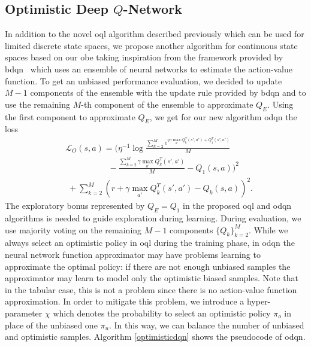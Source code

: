 \subsection{Optimistic Deep $Q$-Network}\label{sec:proposedalg}
In addition to the novel \gls{oql} algorithm described previously which can be used for limited discrete state spaces, we
propose another algorithm for continuous state spaces based on our \gls{obe} taking inspiration from the framework provided by \gls{bdqn}~\cite{osband2017deep}
which uses an ensemble of neural networks to estimate the action-value function.
To get an unbiased performance evaluation, we decided to update $M-1$ components of the ensemble with the update rule provided by \gls{bdqn} and to use the remaining $M$-th component of the ensemble to approximate $Q_E$. Using the first component to approximate $Q_E$, we get for our new algorithm \gls{odqn} the loss
\begin{eqnarray}
	&\mathcal{L}_O(s,a) = (\eta^{-1}\log \frac{\sum_{k=2}^M
	 e^{\eta\gamma\max_{a'}Q_k^T(s',a')+ Q_1^T(s',a')}}{M}\nonumber \\
&\qquad\qquad\;\;\;\;  -  \frac{\sum_{k=2}^M  \gamma\max_{a'}Q^T_k(s',a')}{M} -Q_1(s,a))^2\nonumber \\
&\;  + \sum_{k=2}^M (r + \gamma\max_{a'}Q^T_k(s',a') -
	 Q_k(s,a))^2.  \label{optimisticloss}
\end{eqnarray}
The exploratory bonus represented by $Q_E = Q_1$ in the proposed \gls{oql} and \gls{odqn} algorithms is needed to
guide exploration during learning. During evaluation, we use majority voting on the remaining $M-1$
components $\{Q_k\}_{k=2}^M$. While we always select an optimistic policy in \gls{oql} during the training phase, in
\gls{odqn} the neural network function approximator may have problems learning to approximate the optimal
policy: if there are not enough unbiased samples the approximator may learn to model only the optimistic
biased samples. Note that in the tabular case, this is not a problem since there is no action-value function
approximation. In order to mitigate this problem, we introduce a hyper-parameter $\chi$ which denotes the probability to select an optimistic policy $\pi_o$ in place of the unbiased one $\pi_u$. In this way, we can balance the number of unbiased and optimistic samples.
Algorithm \ref{optimisticdqn} shows the pseudocode of \gls{odqn}. 
